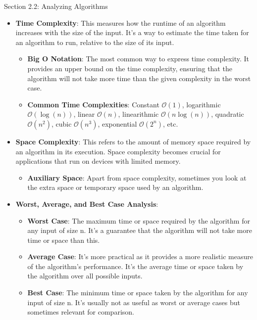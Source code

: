 \begin{notes}{Section 2.2: Analyzing Algorithms}
    \begin{itemize}
        \item \textbf{Time Complexity}: This measures how the runtime of an algorithm increases with the size of the input. It's a way to estimate the time taken for an algorithm to run, relative to 
        the size of its input.
        \begin{itemize}
            \item \textbf{Big O Notation}: The most common way to express time complexity. It provides an upper bound on the time complexity, ensuring that the algorithm will not take more time than 
            the given complexity in the worst case.
            \item \textbf{Common Time Complexities}: Constant $\mathcal{O}(1)$, logarithmic $\mathcal{O}(\log{(n)})$, linear $\mathcal{O}(n)$, linearithmic $\mathcal{O}(n \log{(n)})$, quadratic 
            $\mathcal{O}(n^{2})$, cubic $\mathcal{O}(n^{3})$, exponential $\mathcal{O}(2^{n})$, etc.
        \end{itemize}
        \item \textbf{Space Complexity}: This refers to the amount of memory space required by an algorithm in its execution. Space complexity becomes crucial for applications that run on devices with 
        limited memory.
        \begin{itemize}
            \item \textbf{Auxiliary Space}: Apart from space complexity, sometimes you look at the extra space or temporary space used by an algorithm.
        \end{itemize}
        \item \textbf{Worst, Average, and Best Case Analysis}:
        \begin{itemize}
            \item \textbf{Worst Case}: The maximum time or space required by the algorithm for any input of size n. It's a guarantee that the algorithm will not take more time or space than this.
            \item \textbf{Average Case}: It's more practical as it provides a more realistic measure of the algorithm's performance. It's the average time or space taken by the algorithm over all 
            possible inputs.
            \item \textbf{Best Case}: The minimum time or space taken by the algorithm for any input of size n. It's usually not as useful as worst or average cases but sometimes relevant for comparison.
        \end{itemize}

\end{itemize}
\end{notes}
